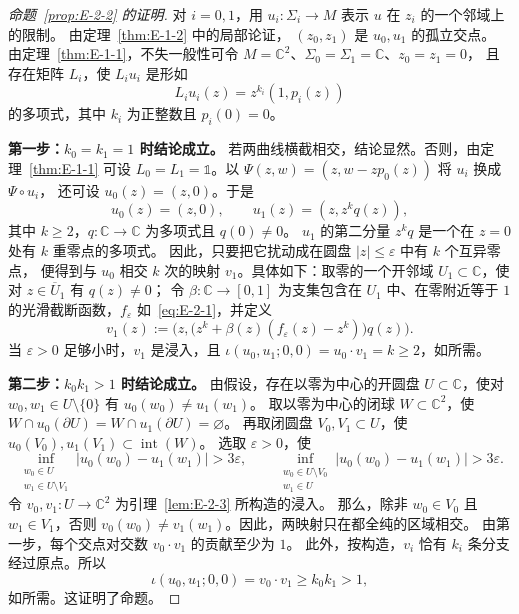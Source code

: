 \begin{proof}[命题~\ref{prop:E-2-2} 的证明]
对 $i=0,1$，用 $u_i:\Sigma_i\to M$ 表示 $u$ 在 $z_i$ 的一个邻域上的限制。
由定理~\ref{thm:E-1-2} 中的局部论证，
$(z_0,z_1)$ 是 $u_0,u_1$ 的孤立交点。
由定理~\ref{thm:E-1-1}，不失一般性可令
$M=\mathbb C^2$、$\Sigma_0=\Sigma_1=\mathbb C$、$z_0=z_1=0$，
且存在矩阵 $L_i$，使 $L_i u_i$ 是形如
\[
  L_i u_i(z)=z^{k_i}(1,p_i(z))
\]
的多项式，其中 $k_i$ 为正整数且 $p_i(0)=0$。

\noindent\textbf{第一步：$k_0=k_1=1$ 时结论成立。}
若两曲线横截相交，结论显然。否则，由定理~\ref{thm:E-1-1} 可设
$L_0=L_1=\mathbb 1$。以
$\Psi(z,w)=(z,w-zp_0(z))$ 将 $u_i$ 换成 $\Psi\circ u_i$，
还可设 $u_0(z)=(z,0)$。于是
\[
  u_0(z)=(z,0),\qquad u_1(z)=(z,z^kq(z)),
\]
其中 $k\ge2$，$q:\mathbb C\to\mathbb C$ 为多项式且 $q(0)\ne0$。
$u_1$ 的第二分量 $z^kq$ 是一个在 $z=0$ 处有 $k$ 重零点的多项式。
因此，只要把它扰动成在圆盘 $|z|\le\varepsilon$ 中有 $k$ 个互异零点，
便得到与 $u_0$ 相交 $k$ 次的映射 $v_1$。具体如下：取零的一个开邻域
$U_1\subset\mathbb C$，使对 $z\in\overline U_1$ 有 $q(z)\ne0$；
令 $\beta:\mathbb C\to[0,1]$ 为支集包含在 $U_1$ 中、在零附近等于 $1$
的光滑截断函数，$f_\varepsilon$ 如~\eqref{eq:E-2-1}，并定义
\[
  v_1(z):=\bigl(z,\bigl(z^k+\beta(z)(f_\varepsilon(z)-z^k)\bigr)q(z)\bigr).
\]
当 $\varepsilon>0$ 足够小时，$v_1$ 是浸入，且
$\iota(u_0,u_1;0,0)=u_0\cdot v_1=k\ge2$，如所需。

\noindent\textbf{第二步：$k_0k_1>1$ 时结论成立。}
由假设，存在以零为中心的开圆盘 $U\subset\mathbb C$，使对
$w_0,w_1\in U\setminus\{0\}$ 有 $u_0(w_0)\ne u_1(w_1)$。
取以零为中心的闭球 $W\subset\mathbb C^2$，使
$W\cap u_0(\partial U)=W\cap u_1(\partial U)=\varnothing$。
再取闭圆盘 $V_0,V_1\subset U$，使
$u_0(V_0),u_1(V_1)\subset\operatorname{int}(W)$。
选取 $\varepsilon>0$，使
\[
  \inf_{\substack{w_0\in U\\w_1\in U\setminus V_1}}
  |u_0(w_0)-u_1(w_1)|>3\varepsilon,\qquad
  \inf_{\substack{w_0\in U\setminus V_0\\w_1\in U}}
  |u_0(w_0)-u_1(w_1)|>3\varepsilon.
\]
令 $v_0,v_1:U\to\mathbb C^2$ 为引理~\ref{lem:E-2-3} 所构造的浸入。
那么，除非 $w_0\in V_0$ 且 $w_1\in V_1$，否则
$v_0(w_0)\ne v_1(w_1)$。因此，两映射只在都全纯的区域相交。
由第一步，每个交点对交数 $v_0\cdot v_1$ 的贡献至少为 $1$。
此外，按构造，$v_i$ 恰有 $k_i$ 条分支经过原点。所以
\[
  \iota(u_0,u_1;0,0)=v_0\cdot v_1\ge k_0k_1>1,
\]
如所需。这证明了命题。
\end{proof}

